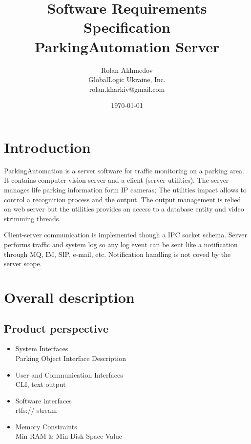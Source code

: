 \documentclass[12pt, a4paper, titlepage]{article}
\title{Software Requirements Specification \\ 
\large ParkingAutomation Server}
\author{Rolan Akhmedov \\ GlobalLogic Ukraine, Inc. \\ rolan.kharkiv@gmail.com }
\date{\today}
\begin{document}
	\maketitle
	
	
	\section{Introduction}
		ParkingAutomation is a server software for traffic monitoring on a parking area.
		It contains computer vision server and a client (server utilities). 
		The server manages life parking information form IP cameras;
		The utilities impact allows to control a recognition process and the output.
		The output management is relied on web server but the utilities provides
		an access to a database entity and video strimming threads.
		\par 
		Client-server communication is implemented though a IPC socket schema.
		Server performs traffic and system log so any log event can be sent like a
		notification through MQ, IM, SIP, e-mail, etc. 
		Notification handling is not coved by the server scope.

	\section{Overall description}
		\subsection{Product perspective}
			\begin{itemize}
				\item System Interfaces \\ Parking Object Interface Description
				\item User and Communication Interfaces \\ CLI, text output
				\item Software interfaces \\ rtfs:// stream
				\item Memory Constraints \\ Min RAM \& Min Disk Space Value
			\end{itemize}
\end{document}
